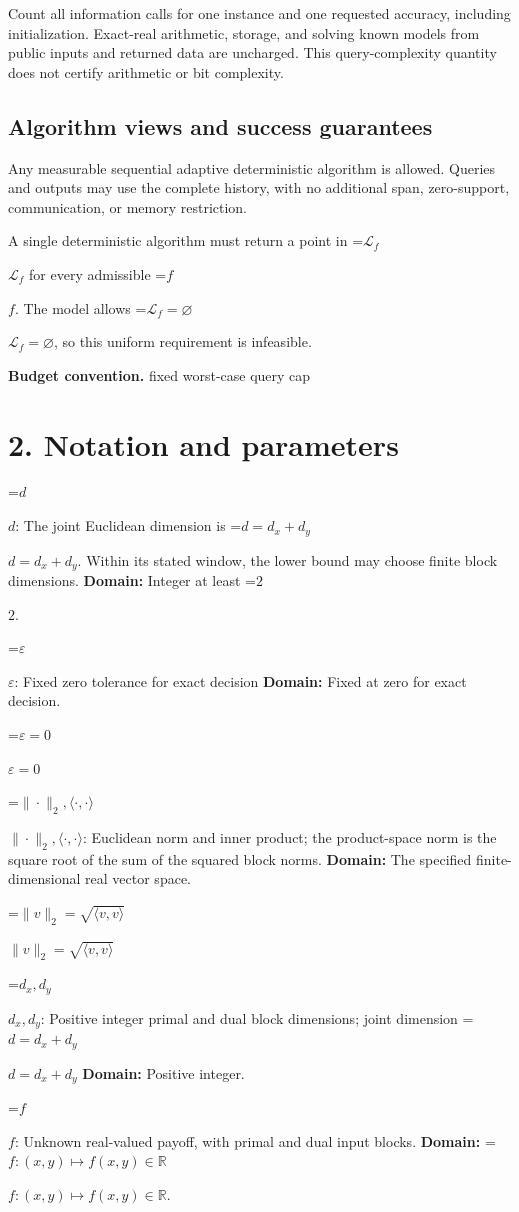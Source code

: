 \documentclass[10pt,a4paper]{article}
\newcommand{\AtlasMath}[1]{\par\begingroup\centering\setbox0=\hbox{$\displaystyle #1$}\ifdim\wd0>1.4\linewidth\typeout{ATLAS WIDE FORMULA: \the\wd0}\fi\ifdim\wd0>\linewidth\resizebox{\linewidth}{!}{\box0}\else\box0\fi\par\endgroup}
\newcommand{\AtlasInlineMath}[1]{\begingroup\setbox0=\hbox{$#1$}\ifdim\wd0>.4\linewidth\endgroup\AtlasMath{#1}\else\endgroup$#1$\fi}
\begin{document}
Count all information calls for one instance and one requested accuracy, including initialization. Exact-real arithmetic, storage, and solving known models from public inputs and returned data are uncharged. This query-complexity quantity does not certify arithmetic or bit complexity.

\subsection{Algorithm views and success guarantees}
Any measurable sequential adaptive deterministic algorithm is allowed. Queries and outputs may use the complete history, with no additional span, zero-support, communication, or memory restriction.

A single deterministic algorithm must return a point in \AtlasInlineMath{\mathcal L_f} for every admissible \AtlasInlineMath{f}. The model allows \AtlasInlineMath{\mathcal L_f=\varnothing}, so this uniform requirement is infeasible.

\textbf{Budget convention.} fixed worst-case query cap

\section{2. Notation and parameters}
\AtlasInlineMath{d}: The joint Euclidean dimension is \AtlasInlineMath{d=d_x+d_y}. Within its stated window, the lower bound may choose finite block dimensions. \textbf{Domain:} Integer at least \AtlasInlineMath{2}.

\AtlasInlineMath{\varepsilon}: Fixed zero tolerance for exact decision \textbf{Domain:} Fixed at zero for exact decision.

\AtlasInlineMath{\varepsilon=0}

\AtlasInlineMath{\|\cdot\|_2,\langle\cdot,\cdot\rangle}: Euclidean norm and inner product; the product-space norm is the square root of the sum of the squared block norms. \textbf{Domain:} The specified finite-dimensional real vector space.

\AtlasInlineMath{\|v\|_2=\sqrt{\langle v,v\rangle}}

\AtlasInlineMath{d_x,d_y}: Positive integer primal and dual block dimensions; joint dimension \AtlasInlineMath{d=d_x+d_y} \textbf{Domain:} Positive integer.

\AtlasInlineMath{f}: Unknown real-valued payoff, with primal and dual input blocks. \textbf{Domain:} \AtlasInlineMath{f:(x,y)\mapsto f(x,y)\in\mathbb R}.
\end{document}
